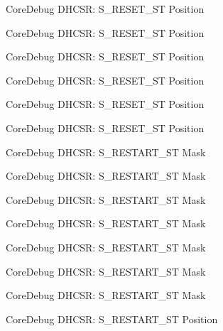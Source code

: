 \begin{DoxyRefList}
\label{deprecated__deprecated000109}%
%
Core\+Debug D\+H\+C\+SR\+: S\+\_\+\+R\+E\+S\+E\+T\+\_\+\+ST Position 

\label{deprecated__deprecated000163}%
%
Core\+Debug D\+H\+C\+SR\+: S\+\_\+\+R\+E\+S\+E\+T\+\_\+\+ST Position 

\label{deprecated__deprecated000248}%
%
Core\+Debug D\+H\+C\+SR\+: S\+\_\+\+R\+E\+S\+E\+T\+\_\+\+ST Position 

\label{deprecated__deprecated000305}%
%
Core\+Debug D\+H\+C\+SR\+: S\+\_\+\+R\+E\+S\+E\+T\+\_\+\+ST Position 

\label{deprecated__deprecated000381}%
%
Core\+Debug D\+H\+C\+SR\+: S\+\_\+\+R\+E\+S\+E\+T\+\_\+\+ST Position 

\label{deprecated__deprecated000460}%
%
Core\+Debug D\+H\+C\+SR\+: S\+\_\+\+R\+E\+S\+E\+T\+\_\+\+ST Position  
\item[Member \mbox{\hyperlink{group__CMSIS__CoreDebug_gabe3254d40aaa482987ff31584d2a3240}{Core\+Debug\+\_\+\+D\+H\+C\+S\+R\+\_\+\+S\+\_\+\+R\+E\+S\+T\+A\+R\+T\+\_\+\+S\+T\+\_\+\+Msk}} ]\label{deprecated__deprecated000008}%
%
Core\+Debug D\+H\+C\+SR\+: S\+\_\+\+R\+E\+S\+T\+A\+R\+T\+\_\+\+ST Mask 

\label{deprecated__deprecated000108}%
%
Core\+Debug D\+H\+C\+SR\+: S\+\_\+\+R\+E\+S\+T\+A\+R\+T\+\_\+\+ST Mask 

\label{deprecated__deprecated000162}%
%
Core\+Debug D\+H\+C\+SR\+: S\+\_\+\+R\+E\+S\+T\+A\+R\+T\+\_\+\+ST Mask 

\label{deprecated__deprecated000247}%
%
Core\+Debug D\+H\+C\+SR\+: S\+\_\+\+R\+E\+S\+T\+A\+R\+T\+\_\+\+ST Mask 

\label{deprecated__deprecated000304}%
%
Core\+Debug D\+H\+C\+SR\+: S\+\_\+\+R\+E\+S\+T\+A\+R\+T\+\_\+\+ST Mask 

\label{deprecated__deprecated000380}%
%
Core\+Debug D\+H\+C\+SR\+: S\+\_\+\+R\+E\+S\+T\+A\+R\+T\+\_\+\+ST Mask 

\label{deprecated__deprecated000459}%
%
Core\+Debug D\+H\+C\+SR\+: S\+\_\+\+R\+E\+S\+T\+A\+R\+T\+\_\+\+ST Mask  
\item[Member \mbox{\hyperlink{group__CMSIS__CoreDebug_gaf6498d32dbe23b8d95a12d2fbc0a65f8}{Core\+Debug\+\_\+\+D\+H\+C\+S\+R\+\_\+\+S\+\_\+\+R\+E\+S\+T\+A\+R\+T\+\_\+\+S\+T\+\_\+\+Pos}} ]\label{deprecated__deprecated000007}%
%
Core\+Debug D\+H\+C\+SR\+: S\+\_\+\+R\+E\+S\+T\+A\+R\+T\+\_\+\+ST Position 


\end{DoxyRefList}
